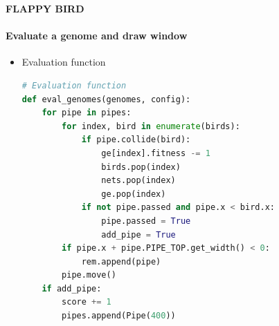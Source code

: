 \documentclass[10pt]{beamer}
\begin{document}
{
%
\begin{frame}[fragile]{\textbf{FLAPPY BIRD}}
    \framesubtitle{\textbf{Evaluate a genome and draw window}}
    \begin{itemize}
        \item Evaluation function \\
            \begin{lstlisting}[language=Python]
    # Evaluation function
def eval_genomes(genomes, config):
    for pipe in pipes:
        for index, bird in enumerate(birds):
            if pipe.collide(bird):
                ge[index].fitness -= 1
                birds.pop(index)
                nets.pop(index)
                ge.pop(index)
            if not pipe.passed and pipe.x < bird.x:
                pipe.passed = True
                add_pipe = True
        if pipe.x + pipe.PIPE_TOP.get_width() < 0:
            rem.append(pipe)   
        pipe.move()
    if add_pipe:
        score += 1
        pipes.append(Pipe(400))
            \end{lstlisting}
    \end{itemize}
\end{frame}
}
\end{document}
